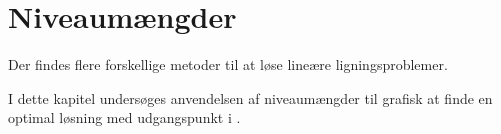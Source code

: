 \chapter{Niveaumængder}	
Der findes flere forskellige metoder til at løse lineære ligningsproblemer. 

I dette kapitel undersøges anvendelsen af niveaumængder til grafisk at finde en optimal løsning med udgangspunkt i \citep{lay}.





%


%
%

